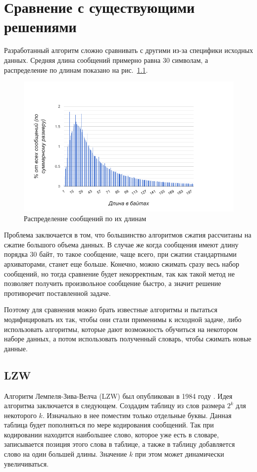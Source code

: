 \chapter{Сравнение с существующими решениями}

Разработанный алгоритм сложно сравнивать с другими из-за специфики исходных данных. 
Средняя длина сообщений примерно равна 30 символам, а распределение по длинам показано на рис.~\ref{fig10}.

\begin{figure}[h!]
  \includegraphics[width=\linewidth]{pics/msgs-len.png}
  \caption{Распределение сообщений по их длинам}
  \label{fig10}
\end{figure}

Проблема заключается в том, что большинство алгоритмов сжатия рассчитаны на сжатие большого объема данных.
В случае же когда сообщения имеют длину порядка 30 байт, то такое сообщение, чаще всего, при сжатии стандартными архиваторами,
станет еще больше. Конечно, можно сжимать сразу весь набор сообщений, но тогда сравнение будет некорректным, так как 
такой метод не позволяет получить произвольное сообщение быстро, а значит решение противоречит поставленной задаче.

Поэтому для сравнения можно брать известные алгоритмы и пытаться модифицировать их так, чтобы они стали применимы к исходной задаче, либо
использовать алгоритмы, которые дают возможность обучиться на некотором наборе данных, а потом использовать полученный словарь, чтобы 
сжимать новые данные.

\section{LZW}
Алгоритм Лемпеля-Зива-Велча (LZW) был опубликован в 1984 году \cite{lzw}.
Идея алгоритма заключается в следующем. Создадим таблицу из слов размера $2^k$ для некоторого $k$. Изначально в нее поместим только отдельные буквы.
Данная таблица будет пополняться по мере кодирования сообщений. Так при кодировании находится наибольшее слово, которое уже есть в словаре, 
записывается позиция этого слова в таблице, а также в таблицу добавляется слово на один большей длины. Значение $k$ при этом может динамически увеличиваться.

